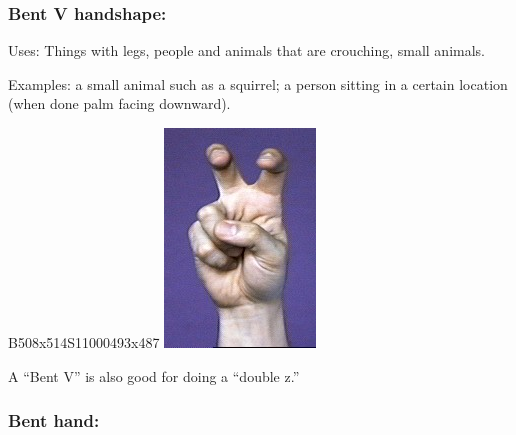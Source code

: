 \documentclass{article}
\begin{document}
\subsubsection{Bent V handshape:}

Uses:
Things with legs, people and animals that are crouching, small animals.

Examples:
a small animal such as a squirrel;
a person sitting in a certain location (when done palm facing downward).

B508x514S11000493x487
\includegraphics[scale=0.5]{images/v-bent.jpg}

A ``Bent V'' is also good for doing a ``double z.''

\subsubsection{Bent hand:}
\end{document}
